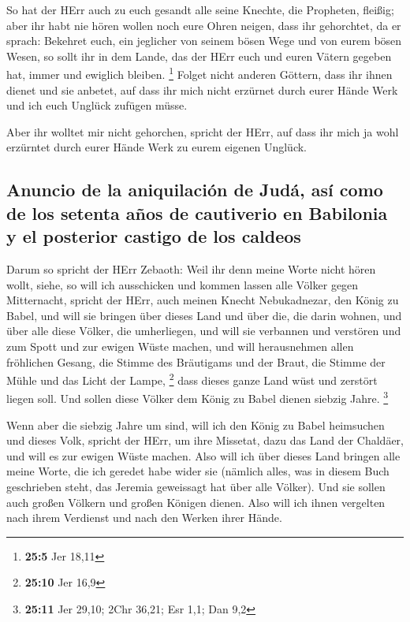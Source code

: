  So hat der HErr auch zu euch gesandt alle seine Knechte,
die Propheten, fleißig; aber ihr habt nie hören wollen noch eure Ohren
neigen, dass ihr gehorchtet,  da er sprach: Bekehret euch,
ein jeglicher von seinem bösen Wege und von eurem bösen Wesen, so sollt
ihr in dem Lande, das der HErr euch und euren Vätern gegeben hat, immer
und ewiglich bleiben. \footnote{\textbf{25:5} Jer 18,11} 
Folget nicht anderen Göttern, dass ihr ihnen dienet und sie anbetet, auf
dass ihr mich nicht erzürnet durch eurer Hände Werk und ich euch Unglück
zufügen müsse.

 Aber ihr wolltet mir nicht gehorchen, spricht der HErr,
auf dass ihr mich ja wohl erzürntet durch eurer Hände Werk zu eurem
eigenen Unglück.

\hypertarget{anuncio-de-la-aniquilaciuxf3n-de-juduxe1-asuxed-como-de-los-setenta-auxf1os-de-cautiverio-en-babilonia-y-el-posterior-castigo-de-los-caldeos}{%
\subsection{Anuncio de la aniquilación de Judá, así como de los setenta
años de cautiverio en Babilonia y el posterior castigo de los
caldeos}\label{anuncio-de-la-aniquilaciuxf3n-de-juduxe1-asuxed-como-de-los-setenta-auxf1os-de-cautiverio-en-babilonia-y-el-posterior-castigo-de-los-caldeos}}

 Darum so spricht der HErr Zebaoth: Weil ihr denn meine
Worte nicht hören wollt,  siehe, so will ich ausschicken
und kommen lassen alle Völker gegen Mitternacht, spricht der HErr, auch
meinen Knecht Nebukadnezar, den König zu Babel, und will sie bringen
über dieses Land und über die, die darin wohnen, und über alle diese
Völker, die umherliegen, und will sie verbannen und verstören und zum
Spott und zur ewigen Wüste machen,  und will herausnehmen
allen fröhlichen Gesang, die Stimme des Bräutigams und der Braut, die
Stimme der Mühle und das Licht der Lampe, \footnote{\textbf{25:10} Jer
  16,9}  dass dieses ganze Land wüst und zerstört liegen
soll. Und sollen diese Völker dem König zu Babel dienen siebzig Jahre.
\footnote{\textbf{25:11} Jer 29,10; 2Chr 36,21; Esr 1,1; Dan 9,2}

 Wenn aber die siebzig Jahre um sind, will ich den König
zu Babel heimsuchen und dieses Volk, spricht der HErr, um ihre Missetat,
dazu das Land der Chaldäer, und will es zur ewigen Wüste machen.
 Also will ich über dieses Land bringen alle meine Worte,
die ich geredet habe wider sie (nämlich alles, was in diesem Buch
geschrieben steht, das Jeremia geweissagt hat über alle Völker).
 Und sie sollen auch großen Völkern und großen Königen
dienen. Also will ich ihnen vergelten nach ihrem Verdienst und nach den
Werken ihrer Hände.

